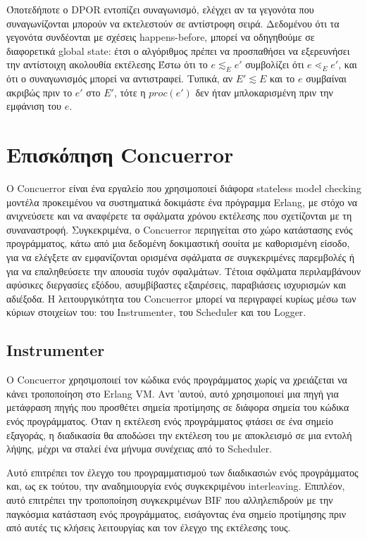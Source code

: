 Όποτεδήποτε ο DPOR εντοπίζει συναγωνισμό, ελέγχει αν τα γεγονότα που συναγωνίζονται μπορούν να εκτελεστούν σε αντίστροφη σειρά.
Δεδομένου ότι τα γεγονότα συνδέονται με σχέσεις happens-before, μπορεί να οδηγηθούμε σε διαφορετικά
global state: έτσι ο αλγόριθμος πρέπει να προσπαθήσει να εξερευνήσει την αντίστοιχη ακολουθία εκτέλεσης
Έστω ότι το $e \lesssim_E e'$ συμβολίζει ότι
$e \lessdot_E e'$, και ότι ο συναγωνισμός μπορεί να αντιστραφεί. Τυπικά, αν $E' \lesssim E$
και το $e$ συμβαίναι ακριβώς πριν το $e'$ στο $E'$, τότε η $proc(e')$ δεν ήταν μπλοκαρισμένη
πριν την εμφάνιση του $e$.


\section{Επισκόπηση Concuerror}

O Concuerror \cite{6569727, Gotovos:2011:TDC:2034654.2034664} είναι ένα εργαλείο που χρησιμοποιεί διάφορα stateless model checking μοντέλα προκειμένου να συστηματικά
δοκιμάστε ένα πρόγραμμα Erlang, με στόχο να ανιχνεύσετε και να αναφέρετε τα σφάλματα χρόνου εκτέλεσης που σχετίζονται με τη συναναστροφή.
Συγκεκριμένα, ο Concuerror περιηγείται στο χώρο κατάστασης ενός προγράμματος, κάτω από μια δεδομένη δοκιμαστική σουίτα με καθορισμένη είσοδο,
για να ελέγξετε αν εμφανίζονται ορισμένα σφάλματα σε συγκεκριμένες παρεμβολές ή για να επαληθεύσετε την απουσία τυχόν σφαλμάτων. Τέτοια σφάλματα περιλαμβάνουν αφύσικες διεργασίες εξόδου, ασυμβίβαστες
εξαιρέσεις, παραβιάσεις ισχυρισμών και αδιέξοδα. Η λειτουργικότητα του Concuerror μπορεί να περιγραφεί κυρίως μέσω των κύριων στοιχείων του:
του Instrumenter, του Scheduler και του Logger.

\subsection{Instrumenter}

Ο Concuerror χρησιμοποιεί τον κώδικα ενός προγράμματος χωρίς να χρειάζεται να κάνει τροποποίηση στο Erlang VM. Αντ 'αυτού, αυτό
χρησιμοποιεί μια πηγή για μετάφραση πηγής που προσθέτει σημεία προτίμησης σε διάφορα σημεία του κώδικα ενός προγράμματος.
Όταν η εκτέλεση ενός προγράμματος φτάσει σε ένα σημείο εξαγοράς, η διαδικασία θα αποδώσει την εκτέλεση του με αποκλεισμό
σε μια εντολή λήψης, μέχρι να σταλεί ένα μήνυμα συνέχειας από το Scheduler.

Αυτό επιτρέπει τον έλεγχο του προγραμματισμού των διαδικασιών ενός προγράμματος και, ως εκ τούτου, την αναδημιουργία ενός συγκεκριμένου
interleaving. Επιπλέον, αυτό επιτρέπει την τροποποίηση συγκεκριμένων BIF που αλληλεπιδρούν με την παγκόσμια
κατάσταση ενός προγράμματος, εισάγοντας ένα σημείο προτίμησης πριν από αυτές τις κλήσεις λειτουργίας και τον έλεγχο της εκτέλεσης τους.

